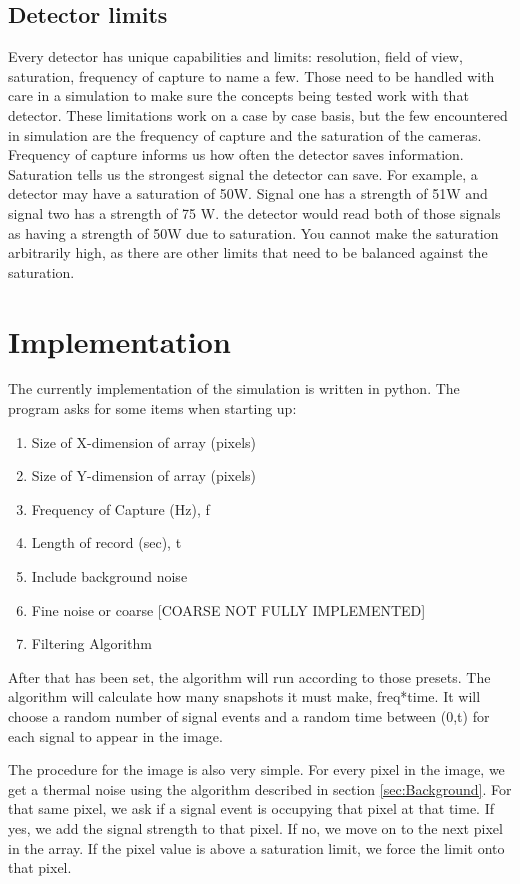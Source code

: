 \documentclass[12pt]{article} %
\begin{document}
\subsection{Detector limits}

Every detector has unique capabilities and limits: resolution, field of view, saturation, frequency of capture to name a few. Those need to be handled with care in a simulation to make sure the concepts being tested work with that detector. These limitations work on a case by case basis, but the few encountered in simulation are the frequency of capture and the saturation of the cameras. Frequency of capture informs us how often the detector saves information. Saturation tells us the strongest signal the detector can save. For example, a detector may have a saturation of 50W. Signal one has a strength of 51W and signal two has a strength of 75 W. the detector would read both of those signals as having a strength of 50W due to saturation. You cannot make the saturation arbitrarily high, as there are other limits that need to be balanced against the saturation.

\section{Implementation}

The currently implementation of the simulation is written in python. The program asks for some items when starting up:

\begin{enumerate}
\item{Size of X-dimension of array (pixels)}
\item {Size of Y-dimension of array (pixels)}
\item{Frequency of Capture (Hz), f}
\item{Length of record (sec), t}
\item{Include background noise}
\item{Fine noise or coarse [COARSE NOT FULLY IMPLEMENTED]}
\item{Filtering Algorithm}
\end{enumerate}

After that has been set, the algorithm will run according to those presets. The algorithm will calculate how many snapshots it must make, freq*time. It will choose a random number of signal events and a random time between (0,t) for each signal to appear in the image. 

The procedure for the image is also very simple. For every pixel in the image, we get a thermal noise using the algorithm described in section \ref{sec:Background}. For that same pixel, we ask if a signal event is occupying that pixel at that time. If yes, we add the signal strength to that pixel. If no, we move on to the next pixel in the array. If the pixel value is above a saturation limit, we force the limit onto that pixel. 
\end{document}
